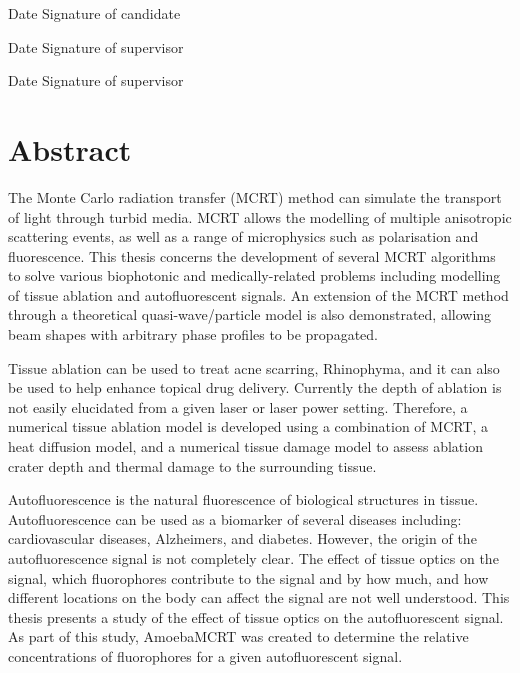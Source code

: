 \documentclass[10pt,a4paper,twoside]{book}
\begin{document}
\medskip

Date\dotfill \hspace{1cm} Signature of candidate \dotfill

\medskip

Date\dotfill \hspace{1cm} Signature of supervisor \dotfill

\medskip

\indent Date\dotfill \hspace{1cm} Signature of supervisor \dotfill


\chapter{Abstract}
The Monte Carlo radiation transfer (MCRT) method can simulate the transport of light through turbid media.
MCRT allows the modelling of multiple anisotropic scattering events, as well as a range of microphysics such as polarisation and fluorescence.
This thesis concerns the development of several MCRT algorithms to solve various biophotonic and medically-related problems including modelling of tissue ablation and autofluorescent signals.
An extension of the MCRT method through a theoretical quasi-wave/particle model is also demonstrated, allowing beam shapes with arbitrary phase profiles to be propagated.

Tissue ablation can be used to treat acne scarring, Rhinophyma, and it can also be used to help enhance topical drug delivery.
Currently the depth of ablation is not easily elucidated from a given laser or laser power setting.
Therefore, a numerical tissue ablation model is developed using a combination of MCRT, a heat diffusion model, and a numerical tissue damage model to assess ablation crater depth and thermal damage to the surrounding tissue.

Autofluorescence is the natural fluorescence of biological structures in tissue.
Autofluorescence can be used as a biomarker of several diseases including: cardiovascular diseases, Alzheimers, and diabetes.
However, the origin of the autofluorescence signal is not completely clear.
The effect of tissue optics on the signal, which fluorophores contribute to the signal and by how much, and how different locations on the body can affect the signal are not well understood.
This thesis presents a study of the effect of tissue optics on the autofluorescent signal.
As part of this study, AmoebaMCRT was created to determine the relative concentrations of fluorophores for a given autofluorescent signal.
\end{document}
